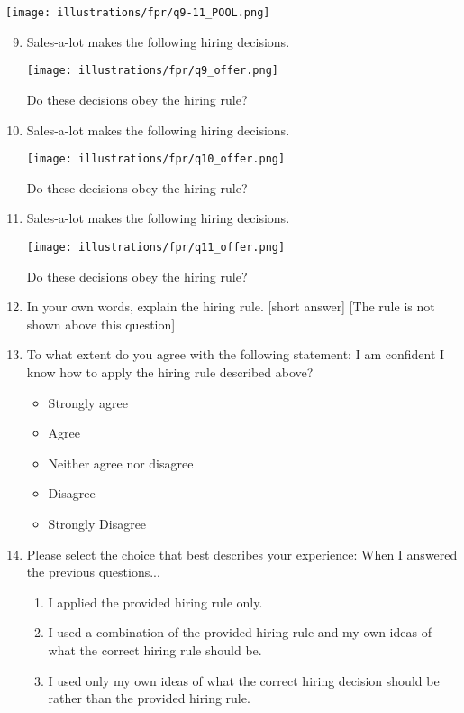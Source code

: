 \documentclass{article}
\newcommand{\correct}[1]{{\color{red}{#1}}}
\newcommand{\correct}[1]{{\color{red}{#1}}}
\begin{document}
\texttt{[image: illustrations/fpr/q9-11\_POOL.png]}
\begin{enumerate}
\setcounter{enumi}{8}
    \item Sales-a-lot makes the following hiring decisions.

    \texttt{[image: illustrations/fpr/q9\_offer.png]}
    
    Do these decisions obey the hiring rule? \correct{Yes}

\item Sales-a-lot makes the following hiring decisions.

    \texttt{[image: illustrations/fpr/q10\_offer.png]}
    
    Do these decisions obey the hiring rule? \correct{No}
    
\item Sales-a-lot makes the following hiring decisions.

    \texttt{[image: illustrations/fpr/q11\_offer.png]}
    
    Do these decisions obey the hiring rule? \correct{No}

\item In your own words, explain the hiring rule. [short answer] [The rule is not shown above this question]

\item To what extent do you agree with the following statement: I am confident I know how to apply the hiring rule described above?
\begin{itemize}
    \item Strongly agree
    \item Agree
    \item Neither agree nor disagree
    \item Disagree
    \item Strongly Disagree
\end{itemize}

\item Please select the choice that best describes your experience: When I answered the previous questions...
\begin{enumerate}
    \item I applied the provided hiring rule only.
    \item I used a combination of the provided hiring rule and my own ideas of what the correct hiring rule should be.
    \item I used only my own ideas of what the correct hiring decision should be rather than the provided hiring rule.
\end{enumerate}


\end{enumerate}
\end{document}
